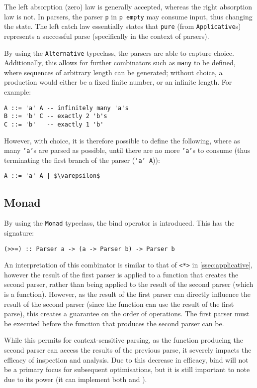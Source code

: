 The left absorption (zero) law is generally accepted, whereas the right absorption law is not.
In parsers, the parser \texttt{p} in \texttt{p \ap empty} may consume input, thus changing the state.
The left catch law essentially states that \texttt{pure} (from \texttt{Applicative}s) represents a successful parse (specifically in the context of parsers).

\bigskip

By using the \texttt{Alternative} typeclass, the parsers are able to capture choice.
Additionally, this allows for further combinators such as \texttt{many} to be defined, where sequences of arbitrary length can be generated; without choice, a production would either be a fixed finite number, or an infinite length.
For example:

\begin{lstlisting}
A ::= 'a' A -- infinitely many 'a's
B ::= 'b' C -- exactly 2 'b's
C ::= 'b'   -- exactly 1 'b'
\end{lstlisting}

However, with choice, it is therefore possible to define the following, where as many \texttt{'a'}s are parsed as possible, until there are no more \texttt{'a'}s to consume (thus terminating the first branch of the parser (\texttt{'a' A})):

\begin{lstlisting}
A ::= 'a' A | $\varepsilon$
\end{lstlisting}

\subsection{Monad}
\label{ssec:monad}

By using the \texttt{Monad} typeclass, the bind operator is introduced.
This has the signature:

\begin{verbatim}
(>>=) :: Parser a -> (a -> Parser b) -> Parser b
\end{verbatim}

An interpretation of this combinator is similar to that of \texttt{<*>} in \autoref{ssec:applicative}, however the result of the first parser is applied to a function that creates the second parser, rather than being applied to the result of the second parser (which is a function).
However, as the result of the first parser can directly influence the result of the second parser (since the function can use the result of the first parse), this creates a guarantee on the order of operations.
The first parser must be executed before the function that produces the second parser can be.

While this permits for context-sensitive parsing, as the function producing the second parser can access the results of the previous parse, it severely impacts the efficacy of inspection and analysis.
Due to this decrease in efficacy, bind will not be a primary focus for subsequent optimisations, but it is still important to note due to its power (it can implement both \texttt{\ap} and \texttt{\fmap}).
